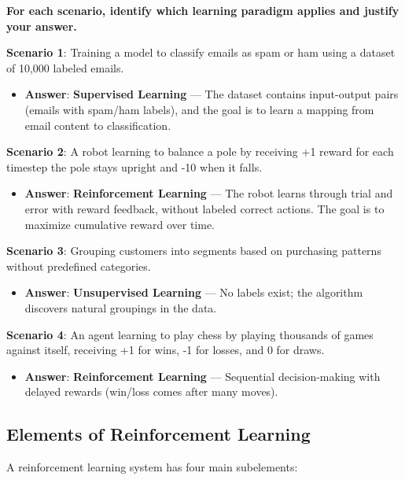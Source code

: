 \documentclass[11pt,a4paper]{article}
\begin{document}
\begin{tcolorbox}[colback=green!5!white,colframe=green!75!black,title=\textbf{Worked Example: Identifying the Learning Paradigm}]
\textbf{For each scenario, identify which learning paradigm applies and justify your answer.}

\textbf{Scenario 1}: Training a model to classify emails as spam or ham using a dataset of 10,000 labeled emails.
\begin{itemize}
    \item \textbf{Answer}: \textbf{Supervised Learning} --- The dataset contains input-output pairs (emails with spam/ham labels), and the goal is to learn a mapping from email content to classification.
\end{itemize}

\textbf{Scenario 2}: A robot learning to balance a pole by receiving +1 reward for each timestep the pole stays upright and -10 when it falls.
\begin{itemize}
    \item \textbf{Answer}: \textbf{Reinforcement Learning} --- The robot learns through trial and error with reward feedback, without labeled correct actions. The goal is to maximize cumulative reward over time.
\end{itemize}

\textbf{Scenario 3}: Grouping customers into segments based on purchasing patterns without predefined categories.
\begin{itemize}
    \item \textbf{Answer}: \textbf{Unsupervised Learning} --- No labels exist; the algorithm discovers natural groupings in the data.
\end{itemize}

\textbf{Scenario 4}: An agent learning to play chess by playing thousands of games against itself, receiving +1 for wins, -1 for losses, and 0 for draws.
\begin{itemize}
    \item \textbf{Answer}: \textbf{Reinforcement Learning} --- Sequential decision-making with delayed rewards (win/loss comes after many moves).
\end{itemize}
\end{tcolorbox}

\subsection{Elements of Reinforcement Learning}

A reinforcement learning system has four main subelements:
\end{document}
